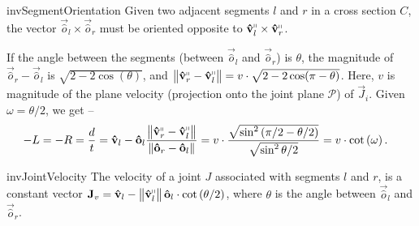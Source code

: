 \begin{restatable}{inv}{SegmentOrientation}
\label{inv:SegmentOrientation}
Given two adjacent segments $l$ and $r$ in a cross section $C$, the vector
$\vec{\hat o}_l\times \vec{\hat o}_r$ must be oriented opposite to $\vec{\hat v}_l^\shortparallel\times \vec{\hat v}_r^\shortparallel$.
\end{restatable}

If the angle between the segments (between $\vec{\hat o}_l$ and $\vec{\hat o}_r$) is $\theta$,
the magnitude of $\vec{\hat o}_r-\vec{\hat o}_l$ is $\sqrt{2-2\cos(\theta)}$,
and $ \left\| \vec{\hat v}_r^\shortparallel-\vec{\hat v}_l^\shortparallel\right\| = v\cdot\sqrt{2-2\cos(\pi-\theta)}$.
Here, $v$ is magnitude of the plane velocity (projection onto the joint plane
$\mathcal P$) of $\vec J_i$.
Given $\omega = \theta/2$, we get --
\begin{align*}
-L = -R &= \frac dt = \vec{\hat v}_l - \vec{\hat o}_l\frac{ \left\| \vec{\hat v}_r^\shortparallel
- \vec{\hat v}_l^\shortparallel\right\|}{ \left\| \vec{\hat o}_r-\vec{\hat o}_l\right\|}
= v\cdot\frac{\sqrt{\sin^2\left( {\pi/2-\theta/2}\right)}}{\sqrt{\sin^2{\theta/2}}}
= v\cdot\cot\left( \omega \right).
\end{align*}

\begin{restatable}{inv}{JointVelocity}
\label{inv:joint_velocity}
The velocity of a joint $J$ associated with segments $l$ and $r$, is a constant vector
$\vec J_v
= \vec{\hat v}_l - \left\| \vec{\hat v}_l^\shortparallel\right\|\vec{\hat o}_l\cdot\cot\left( \theta/2 \right)$,
where $\theta$ is the angle between $\vec{\hat o}_l$ and $\vec{\hat o}_r$.
\end{restatable}

